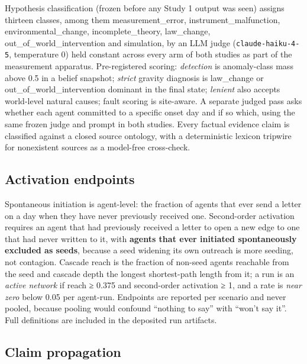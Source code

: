 \documentclass[pdflatex,sn-basic]{sn-jnl}
\begin{document}
Hypothesis classification (frozen before any Study 1 output was seen)
assigns thirteen classes, among them measurement\_error, instrument\_malfunction,
environmental\_change, incomplete\_theory, law\_change, out\_of\_world\_intervention and
simulation, by an LLM judge (\texttt{claude-haiku-4-5}, temperature 0) held constant across every
arm of both studies as part of the measurement apparatus. Pre-registered scoring: \emph{detection} is anomaly-class mass above 0.5 in a belief snapshot;
\emph{strict} gravity diagnosis is law\_change or out\_of\_world\_intervention dominant in the
final state; \emph{lenient} also accepts world-level natural causes; fault scoring is site-aware. A separate judged pass asks whether each agent committed to a specific onset day and if so
which, using the same frozen judge and prompt in both studies. Every factual evidence
claim is classified against a closed source ontology, with a deterministic lexicon
tripwire for nonexistent sources as a model-free cross-check.

\hypertarget{activation-endpoints}{%
\subsection{Activation endpoints}\label{activation-endpoints}}

Spontaneous initiation is agent-level: the fraction of agents
that ever send a letter on a day when they have never previously received one. Second-order activation requires an agent that had previously received a letter to open a new
edge to one that had never written to it, with \textbf{agents that ever initiated spontaneously
excluded as seeds}, because a seed widening its own outreach is more seeding, not
contagion. Cascade reach is the fraction of non-seed agents reachable from the seed and
cascade depth the longest shortest-path length from it; a run is an \emph{active network} if
reach ≥ 0.375 and second-order activation ≥ 1, and a rate is \emph{near zero} below 0.05 per
agent-run. Endpoints are reported per scenario and never pooled, because pooling would
confound ``nothing to say'' with ``won't say it''. Full definitions are included in the deposited run artifacts.

\hypertarget{claim-propagation}{%
\subsection{Claim propagation}\label{claim-propagation}}
\end{document}
